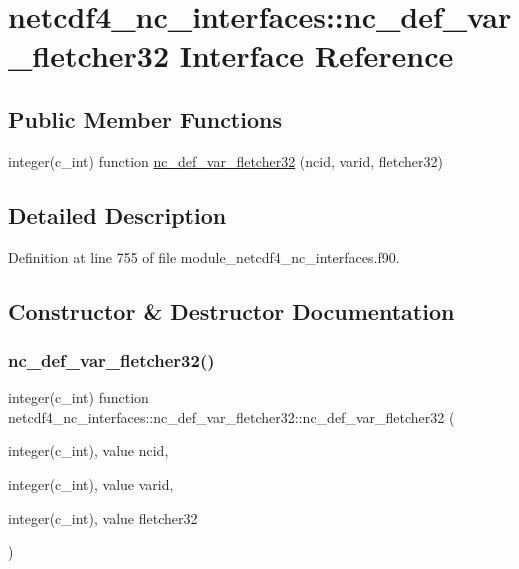 \hypertarget{interfacenetcdf4__nc__interfaces_1_1nc__def__var__fletcher32}{}\section{netcdf4\+\_\+nc\+\_\+interfaces\+:\+:nc\+\_\+def\+\_\+var\+\_\+fletcher32 Interface Reference}
\label{interfacenetcdf4__nc__interfaces_1_1nc__def__var__fletcher32}
\subsection*{Public Member Functions}
\begin{DoxyCompactItemize}
\item 
integer(c\+\_\+int) function \hyperlink{interfacenetcdf4__nc__interfaces_1_1nc__def__var__fletcher32_a633e94f1af43d5249074ca61951c4ac7}{nc\+\_\+def\+\_\+var\+\_\+fletcher32} (ncid, varid, fletcher32)
\end{DoxyCompactItemize}


\subsection{Detailed Description}


Definition at line 755 of file module\+\_\+netcdf4\+\_\+nc\+\_\+interfaces.\+f90.



\subsection{Constructor \& Destructor Documentation}
\mbox{\label{interfacenetcdf4__nc__interfaces_1_1nc__def__var__fletcher32_a633e94f1af43d5249074ca61951c4ac7}} 
\subsubsection{\texorpdfstring{nc\+\_\+def\+\_\+var\+\_\+fletcher32()}{nc\_def\_var\_fletcher32()}}
{\footnotesize\ttfamily integer(c\+\_\+int) function netcdf4\+\_\+nc\+\_\+interfaces\+::nc\+\_\+def\+\_\+var\+\_\+fletcher32\+::nc\+\_\+def\+\_\+var\+\_\+fletcher32 (\begin{DoxyParamCaption}\item[{integer(c\+\_\+int), value}]{ncid,  }\item[{integer(c\+\_\+int), value}]{varid,  }\item[{integer(c\+\_\+int), value}]{fletcher32 }\end{DoxyParamCaption})}



